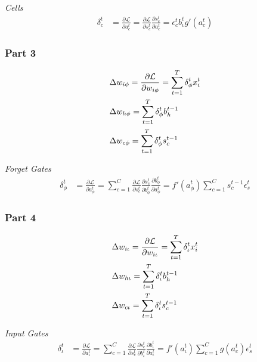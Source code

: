 \documentclass[a4paper,11pt,titlepage,UTF8]{article}
\begin{document}
        \emph{Cells}
        \begin{align}
        \delta_c^t &= \frac{\partial \mathcal{L}}{\partial a_c^t}
        = \frac{\partial \mathcal{L}}{\partial s_c^t} \frac{\partial s_c^t}{\partial a_c^t}
        = \epsilon_c^t b_\iota^t g'(a_c^t)
        \end{align}

        \subsubsection{Part 3}

        \begin{align}
        & \Delta w_{i\phi} = \frac{\partial \mathcal{L}}{\partial w_{i\phi}}
        = \sum_{t=1}^T \delta_\phi^t x_i^t \notag \\
        & \Delta w_{h\phi} = \sum_{t=1}^T \delta_\phi^t b_h^{t-1} \notag \\
        & \Delta w_{c\phi} = \sum_{t=1}^T \delta_\phi^t s_c^{t-1} \notag
        \end{align}

        \emph{Forget Gates}
        \begin{align}
        \delta_\phi^t &= \frac{\partial \mathcal{L}}{\partial a_\phi^t}
        = \sum_{c=1}^C \frac{\partial \mathcal{L}}{\partial s_c^t} \frac{\partial s_c^t}{\partial b_\phi^t} \frac{\partial b_\phi^t}{\partial a_\phi^t}
        = f'(a_\phi^t) \sum_{c=1}^C s_c^{t-1} \epsilon_s^t
        \end{align}

        \subsubsection{Part 4}

        \begin{align}
        & \Delta w_{i\iota} = \frac{\partial \mathcal{L}}{\partial w_{i\iota}}
        = \sum_{t=1}^T \delta_\iota^t x_i^t \notag \\
        & \Delta w_{h\iota} = \sum_{t=1}^T \delta_\iota^t b_h^{t-1} \notag \\
        & \Delta w_{c\iota} = \sum_{t=1}^T \delta_\iota^t s_c^{t-1} \notag
        \end{align}

        \emph{Input Gates}
        \begin{align}
        \delta_\iota^t &= \frac{\partial \mathcal{L}}{\partial a_\iota^t}
        = \sum_{c=1}^C \frac{\partial \mathcal{L}}{\partial s_c^t} \frac{\partial s_c^t}{\partial b_\iota^t} \frac{\partial b_\iota^t}{\partial a_\iota^t}
        = f'(a_\iota^t) \sum_{c=1}^C g(a_c^{t}) \epsilon_s^t
        \end{align}
\end{document}
